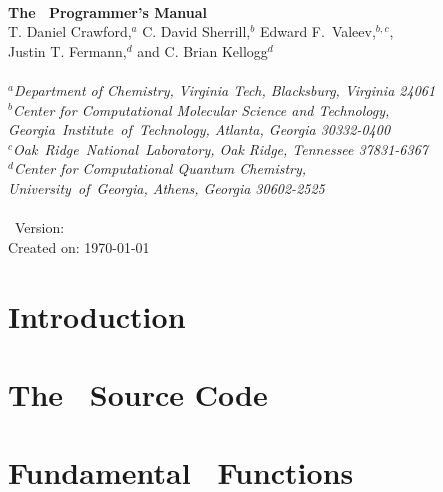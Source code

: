\documentclass[12pt]{article}
\begin{document}


\initfuncdesc

\begin{center}
\ \\
\vspace{2.0in}
{\bf {\Large The \PSIthree\ Programmer's Manual}} \\
\vspace{0.5in} 
T. Daniel Crawford,$^a$ C. David Sherrill,$^b$ Edward F.\ Valeev,$^{b,c}$, \\
Justin T. Fermann,$^d$ and C. Brian Kellogg$^d$ \\ 
\ \\ 
{\em $^a$Department of Chemistry, Virginia Tech, Blacksburg, Virginia 24061} \\
\vspace{0.1in}
{\em $^b$Center for Computational Molecular Science and Technology, \mbox{Georgia 
Institute of Technology,} Atlanta, Georgia 30332-0400} \\
\vspace{0.1in}
{\em $^c$\mbox{Oak Ridge National Laboratory,} Oak Ridge, Tennessee 37831-6367}\\
\vspace{0.1in}
{\em $^d$Center for Computational Quantum Chemistry, \\ 
\mbox{University of Georgia,} Athens, Georgia 30602-2525} \\
\ \\
\vspace{0.3in}
\PSIthree\ Version: \PSIversion \\
Created on: \today
\end{center}

\thispagestyle{empty}

\newpage
\tableofcontents

\newpage
\section{Introduction}



\section{The \PSIthree\ Source Code}\label{cvs}


\section{Fundamental \PSIthree\ Functions}\label{Fundamental_PSI}

\end{document}
